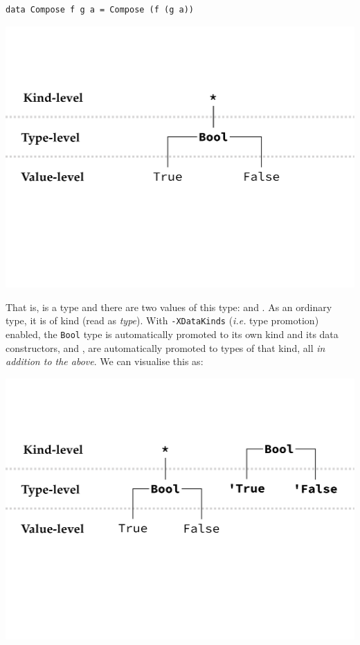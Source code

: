 \pagebreak

\begin{verbatim}
data Compose f g a = Compose (f (g a))
\end{verbatim}

\taskLine


\includegraphics[clip, trim=0cm 10cm 0cm 6cm, width=1.00\textwidth]{labs/bool.pdf}

That is,  is a type and there are two values of this type:  and . As an ordinary type, it is of kind \haskellIn{*} (read as \emph{type}). With \texttt{\small -XDataKinds} (\emph{i.e.} type promotion) enabled, the \texttt{\small Bool} type is automatically promoted to its own kind and its data constructors,  and , are automatically promoted to types of that kind, all \emph{in addition to the above}. We can visualise this as:

\includegraphics[clip, trim=0cm 10cm 0cm 6cm, width=1.00\textwidth]{labs/bool-promoted.pdf}

